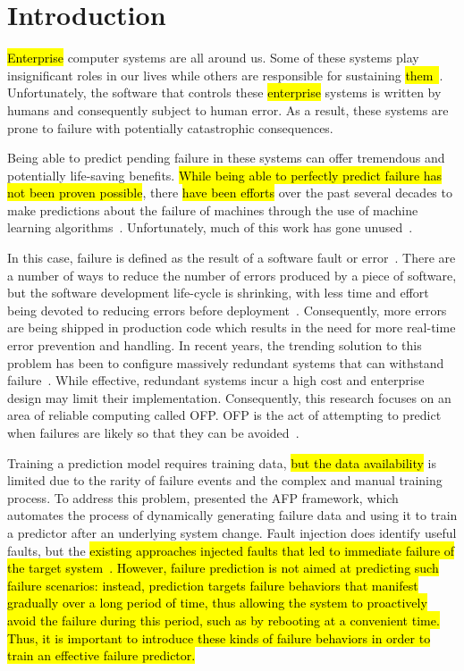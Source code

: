 \section{Introduction} \label{chapter1}
\hl{Enterprise} computer systems are all around us.  Some of these systems play
insignificant roles in our lives while others are responsible for sustaining
\hl{them~\citep{mandal2016,niemi2017}}.  Unfortunately, the software that
controls these \hl{enterprise} systems is written by humans and consequently
subject to human error.  As a result, these systems are prone to failure with
potentially catastrophic consequences.  

Being able to predict pending failure in these systems can offer tremendous and
potentially life-saving benefits.  \hl{While being able to perfectly predict
failure has not been proven possible}, there \hl{have been efforts} over the
past several decades to make predictions about the failure of machines through
the use of machine learning algorithms~\citep{salfnerSurvey}.  Unfortunately,
much of this work has gone unused~\citep{irrera2015}.  

In this case, failure is defined as the result of a software fault or
error~\citep{salfnerSurvey}.  There are a number of ways to reduce the number
of errors produced by a piece of software, but the software development
life-cycle is shrinking, with less time and effort being devoted to reducing
errors before deployment~\citep{schmidt2016}.  Consequently, more errors are
being shipped in production code which results in the need for more real-time
error prevention and handling.  In recent years, the trending solution to this
problem has been to configure massively redundant systems that can withstand
failure~\citep{bauer2012}.  While effective, redundant systems incur a high
cost and enterprise design may limit their implementation.  Consequently, this
research focuses on an area of reliable computing called \ac{OFP}.  \ac{OFP} is
the act of attempting to predict when failures are likely so that they can be
avoided~\citep{salfnerSurvey}.  

Training a prediction model requires training data, \hl{but the data
availability} is limited due to the rarity of failure events and the complex
and manual training process.  To address this problem, \citet{irrera2015}
presented the \ac{AFP} framework, which automates the process of dynamically
generating failure data and using it to train a predictor after an underlying
system change.  Fault injection does identify useful faults, but the
\hl{existing approaches injected faults that led to immediate failure of the
target system~\citep{kikuchi2014,natella2016assessing}.  However, failure
prediction is not aimed at predicting such failure scenarios: instead,
prediction targets failure behaviors that manifest gradually over a long
period of time, thus allowing the system to proactively avoid the failure
during this period, such as by rebooting at a convenient time. Thus, it is
important to introduce these kinds of failure behaviors in order to train an
effective failure predictor.}

